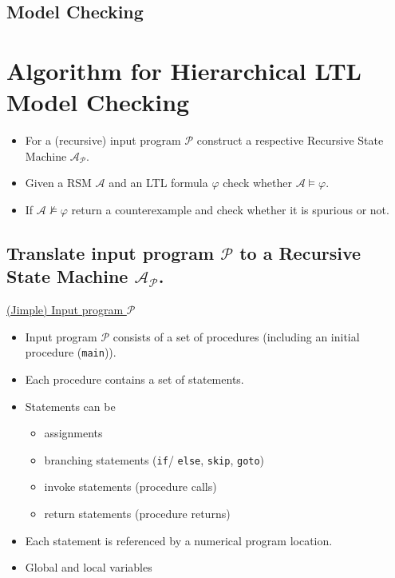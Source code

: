 \documentclass[a4paper,12pt]{article}
\begin{document}
\subsection{Model Checking}


\section{Algorithm for Hierarchical LTL Model Checking}

\begin{itemize}
	\item For a (recursive) input program $\mathcal{P}$ construct a respective Recursive State Machine $\mathcal{A}_{\mathcal{P}}$. 
	\item Given a RSM $\mathcal{A}$ and an LTL formula $\varphi$ check whether $\mathcal{A} \models \varphi$. 
	\item If $\mathcal{A} \nvDash \varphi$ return a counterexample and check whether it is spurious or not.
\end{itemize}

\subsection{Translate input program $\mathcal{P}$ to a Recursive State Machine $\mathcal{A}_{\mathcal{P}}$.}

\underline{(Jimple) Input program $\mathcal{P}$}
\begin{itemize}
	\item Input program $\mathcal{P}$ consists of a set of procedures (including an initial procedure (\texttt{main})).
	\item Each procedure contains a set of statements. 
	\item Statements can be
	\begin{itemize}
		\item assignments
		\item branching statements (\texttt{if}/ \texttt{else}, \texttt{skip}, \texttt{goto})
		\item invoke statements (procedure calls)
		\item return statements (procedure returns)
	\end{itemize}
	\item Each statement is referenced by a numerical program location.
	\item Global and local variables
\end{itemize}
\end{document}
